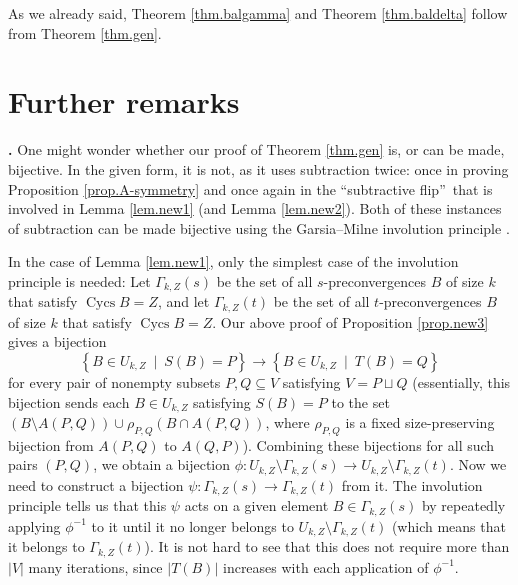 \documentclass[numbers=enddot,12pt,final,onecolumn,notitlepage]{scrartcl}%
\theoremstyle{definition}
\theoremstyle{plainsl}
\begin{document}
As we already said, Theorem \ref{thm.balgamma} and Theorem \ref{thm.baldelta}
follow from Theorem \ref{thm.gen}.


\section{Further remarks}

\textbf{.} One might wonder whether our proof of Theorem \ref{thm.gen}
is, or can be made, bijective. In the given form, it is not, as it uses
subtraction twice: once in proving Proposition \ref{prop.A-symmetry} and once
again in the \textquotedblleft subtractive flip\textquotedblright\ that is
involved in Lemma \ref{lem.new1} (and Lemma \ref{lem.new2}). Both of these
instances of subtraction can be made bijective using the Garsia--Milne
involution principle \cite[\S 4.6]{StaWhi86}.

In the case of Lemma \ref{lem.new1}, only the simplest case of the involution
principle is needed: Let $\Gamma_{k,Z}\left(  s\right)  $ be the set of all
$s$-preconvergences $B$ of size $k$ that satisfy $\operatorname*{Cycs}B=Z$,
and let $\Gamma_{k,Z}\left(  t\right)  $ be the set of all $t$-preconvergences
$B$ of size $k$ that satisfy $\operatorname*{Cycs}B=Z$. Our above proof of
Proposition \ref{prop.new3} gives a bijection%
\[
\left\{  B\in U_{k,Z}\ \mid\ S\left(  B\right)  =P\right\}  \rightarrow
\left\{  B\in U_{k,Z}\ \mid\ T\left(  B\right)  =Q\right\}
\]
for every pair of nonempty subsets $P,Q\subseteq V$ satisfying $V=P\sqcup Q$
(essentially, this bijection sends each $B\in U_{k,Z}$ satisfying $S\left(
B\right)  =P$ to the set $\left(  B\setminus A\left(  P,Q\right)  \right)
\cup\rho_{P,Q}\left(  B\cap A\left(  P,Q\right)  \right)  $, where $\rho
_{P,Q}$ is a fixed size-preserving bijection from $A\left(  P,Q\right)  $ to
$A\left(  Q,P\right)  $). Combining these bijections for all such pairs
$\left(  P,Q\right)  $, we obtain a bijection $\phi:U_{k,Z}\setminus
\Gamma_{k,Z}\left(  s\right)  \rightarrow U_{k,Z}\setminus\Gamma_{k,Z}\left(
t\right)  $. Now we need to construct a bijection $\psi:\Gamma_{k,Z}\left(
s\right)  \rightarrow\Gamma_{k,Z}\left(  t\right)  $ from it. The involution
principle tells us that this $\psi$ acts on a given element $B\in\Gamma
_{k,Z}\left(  s\right)  $ by repeatedly applying $\phi^{-1}$ to it until it no
longer belongs to $U_{k,Z}\setminus\Gamma_{k,Z}\left(  t\right)  $ (which
means that it belongs to $\Gamma_{k,Z}\left(  t\right)  $). It is not hard to
see that this does not require more than $\left\vert V\right\vert $ many
iterations, since $\left\vert T\left(  B\right)  \right\vert $ increases with
each application of $\phi^{-1}$.
\end{document}
